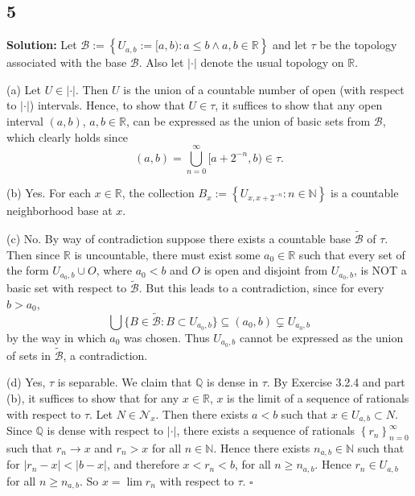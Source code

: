 \documentclass[12pt]{article}
\newcounter{ProofCounter}
\newenvironment{Solution}{\stepcounter{ProofCounter}\textbf{Solution:}}{\hfill$\square$}
\begin{document}
\subsection*{5}
\begin{Solution}
  Let $\mathcal{B} := \left\{ U_{a,b} := [a,b) : a \leq b \wedge a,b\in \mathbb{R} \right\}$ and let $\tau$ be the topology associated with the base $\mathcal{B}$.
  Also let $|\cdot|$ denote the usual topology on $\mathbb{R}$.

  (a) Let $U \in |\cdot|$. Then $U$ is the union of a countable number of open (with respect to $|\cdot|$) intervals. Hence, to show that $U \in \tau$, it suffices to show that
  any open interval $(a,b)$, $a,b \in \mathbb{R}$, can be expressed as the union of basic sets from $\mathcal{B}$, which clearly holds since 
  \[
    (a,b) = \bigcup_{n=0}^{\infty}[a + 2^{-n}, b) \in \tau.
  \]

  (b) Yes. For each $x \in \mathbb{R}$, the collection $B_x := \left\{ U_{x,x+2^{-n}} : n \in \mathbb{N} \right\}$ is a countable neighborhood base at
  $x$.

  (c) No. By way of contradiction suppose there exists a countable base $\tilde{\mathcal{B}}$ of $\tau$. Then since $\mathbb{R}$ is uncountable, there must
  exist some $a_0 \in \mathbb{R}$ such that every set of the form $U_{a_0,b} \cup O$, where $a_0 < b$ and $O$ is open and disjoint from $U_{a_0,b}$, is NOT a basic set with respect to
  $\tilde{\mathcal{B}}$. But this leads to a contradiction, since for every $b > a_0$,
  \[
    \bigcup \{B \in \tilde{\mathcal{B}} : B\subset U_{a_0,b}\} \subseteq (a_0, b) \subsetneq U_{a_0,b}
  \]
  by the way in which $a_0$ was chosen. Thus $U_{a_0,b}$ cannot be expressed as the union of sets in $\tilde{\mathcal{B}}$, a contradiction.

  (d) Yes, $\tau$ is separable. We claim that $\mathbb{Q}$ is dense in $\tau$. By Exercise 3.2.4 and part (b), it suffices to show that for any $x \in
  \mathbb{R}$, $x$ is the limit of a sequence of rationals with respect to $\tau$. Let $N \in \mathcal{N}_x$. Then there exists $a < b$ such that $x \in U_{a,b} \subset N$.
  Since $\mathbb{Q}$ is dense with respect to $|\cdot|$, there exists a sequence of rationals $\left\{ r_n \right\}_{n=0}^{\infty}$ such that $r_n
  \rightarrow x$ and $r_n > x$ for all $n \in \mathbb{N}$. Hence there exists $n_{a,b} \in\mathbb{N}$ such that for $|r_n - x| < |b - x|$,
  and therefore $x < r_n < b$, for all $n
  \geq n_{a,b}$. Hence $r_n \in U_{a,b}$ for all $n \geq n_{a,b}$. So $x = \lim r_n$ with respect to $\tau$.
\end{Solution}
\end{document}
